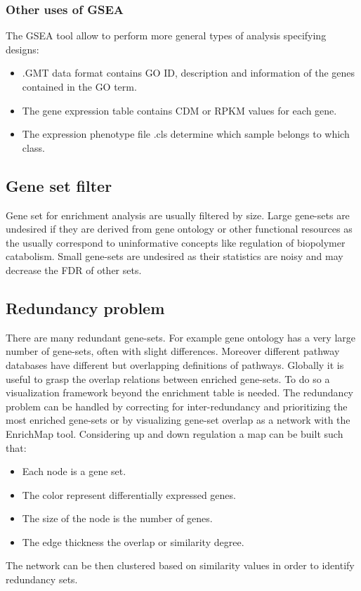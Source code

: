		\subsubsection{Other uses of GSEA}
		The GSEA tool allow to perform more general types of analysis specifying designs:

		\begin{multicols}{2}
			\begin{itemize}
				\item .GMT data format contains GO ID, description and information of the genes contained in the GO term.
				\item The gene expression table contains CDM or RPKM values for each gene.
				\item The expression phenotype file .cls determine which sample belongs to which class.
			\end{itemize}
		\end{multicols}

	\subsection{Gene set filter}
	Gene set for enrichment analysis are usually filtered by size.
	Large gene-sets are undesired if they are derived from gene ontology or other functional resources as the usually correspond to uninformative concepts like regulation of biopolymer catabolism.
	Small gene-sets are undesired as their statistics are noisy and may decrease the FDR of other sets.

	\subsection{Redundancy problem}
	There are many redundant gene-sets.
	For example gene ontology has a very large number of gene-sets, often with slight differences.
	Moreover different pathway databases have different but overlapping definitions of pathways.
	Globally it is useful to grasp the overlap relations between enriched gene-sets.
	To do so a visualization framework beyond the enrichment table is needed.
	The redundancy problem can be handled by correcting for inter-redundancy and prioritizing the most enriched gene-sets or by visualizing gene-set overlap as a network with the EnrichMap tool.
	Considering up and down regulation a map can be built such that:

	\begin{multicols}{2}
		\begin{itemize}
			\item Each node is a gene set.
			\item The color represent differentially expressed genes.
			\item The size of the node is the number of genes.
			\item The edge thickness the overlap or similarity degree.
		\end{itemize}
	\end{multicols}

	The network can be then clustered based on similarity values in order to identify redundancy sets.
